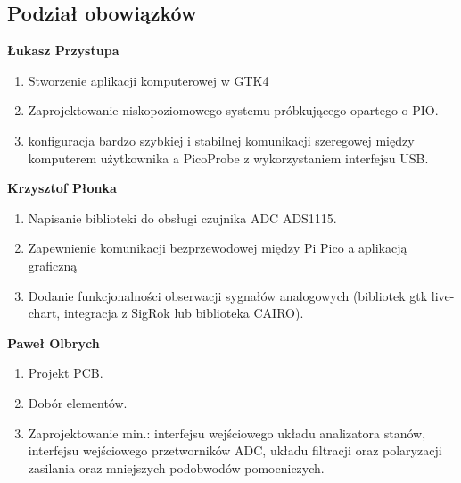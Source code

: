 \subsection{Podział obowiązków}
    \textbf{Łukasz Przystupa}
    \begin{enumerate}
        \item Stworzenie aplikacji komputerowej w GTK4
        \item Zaprojektowanie niskopoziomowego systemu próbkującego opartego o PIO.
        \item konfiguracja bardzo szybkiej i stabilnej komunikacji szeregowej między
        komputerem użytkownika a PicoProbe z wykorzystaniem interfejsu USB.
    \end{enumerate}

    \textbf{Krzysztof Płonka}
    \begin{enumerate}
        \item Napisanie biblioteki do obsługi czujnika ADC ADS1115.
        \item Zapewnienie komunikacji bezprzewodowej między Pi Pico a aplikacją graficzną
        \item Dodanie funkcjonalności obserwacji sygnałów analogowych
        (bibliotek gtk live-chart, integracja z SigRok lub biblioteka CAIRO).
    \end{enumerate}

    \textbf{Paweł Olbrych}
    \begin{enumerate}
        \item Projekt PCB.
        \item Dobór elementów.
        \item Zaprojektowanie min.: interfejsu wejściowego układu analizatora stanów,
        interfejsu wejściowego przetworników ADC, układu filtracji oraz polaryzacji zasilania oraz
        mniejszych podobwodów pomocniczych. 
    \end{enumerate}
    